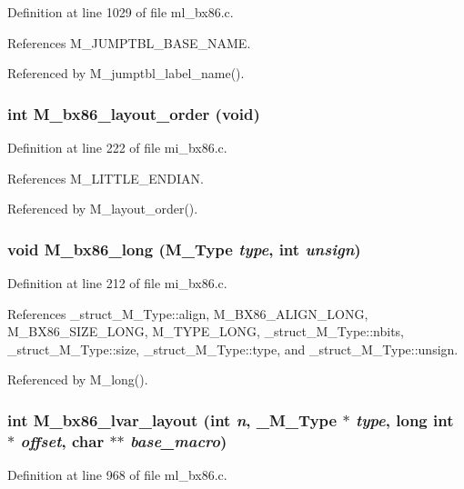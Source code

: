 Definition at line 1029 of file ml\_\-bx86.c.

References M\_\-JUMPTBL\_\-BASE\_\-NAME.

Referenced by M\_\-jumptbl\_\-label\_\-name().
\subsubsection{\setlength{\rightskip}{0pt plus 5cm}int M\_\-bx86\_\-layout\_\-order (void)}\label{m__bx86_8h_ed0ec21bf8df2cde3cbbf6a1794f3971}




Definition at line 222 of file mi\_\-bx86.c.

References M\_\-LITTLE\_\-ENDIAN.

Referenced by M\_\-layout\_\-order().
\subsubsection{\setlength{\rightskip}{0pt plus 5cm}void M\_\-bx86\_\-long (\bf{M\_\-Type} {\em type}, int {\em unsign})}\label{m__bx86_8h_bfca10da51412ea3725b11612cd2aede}




Definition at line 212 of file mi\_\-bx86.c.

References \_\-struct\_\-M\_\-Type::align, M\_\-BX86\_\-ALIGN\_\-LONG, M\_\-BX86\_\-SIZE\_\-LONG, M\_\-TYPE\_\-LONG, \_\-struct\_\-M\_\-Type::nbits, \_\-struct\_\-M\_\-Type::size, \_\-struct\_\-M\_\-Type::type, and \_\-struct\_\-M\_\-Type::unsign.

Referenced by M\_\-long().
\subsubsection{\setlength{\rightskip}{0pt plus 5cm}int M\_\-bx86\_\-lvar\_\-layout (int {\em n}, \bf{\_\-M\_\-Type} $\ast$ {\em type}, long int $\ast$ {\em offset}, char $\ast$$\ast$ {\em base\_\-macro})}\label{m__bx86_8h_0842e184f1f9d2921d28ab34daa640fd}




Definition at line 968 of file ml\_\-bx86.c.

